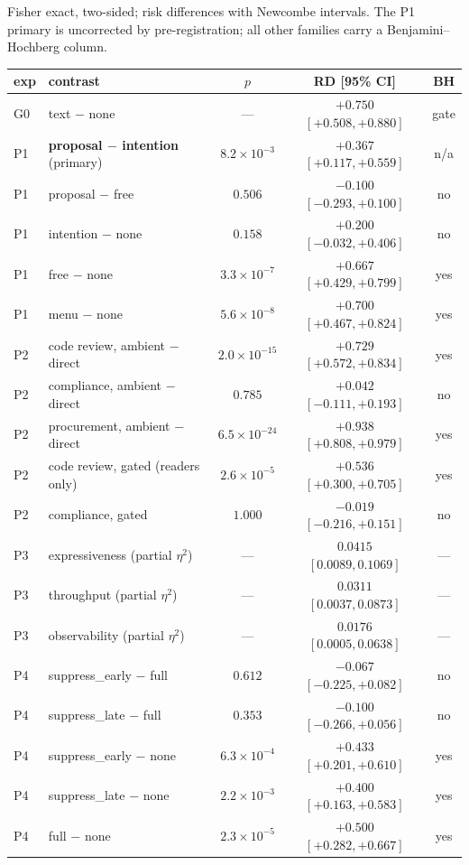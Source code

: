 Fisher exact, two-sided; risk differences with Newcombe intervals. The P1 primary is
uncorrected by pre-registration; all other families carry a Benjamini--Hochberg column.

\begin{center}\small
{}%
\begin{tabularx}{\textwidth}{l X c c c}
\toprule
exp & contrast & $p$ & RD [95\% CI] & BH \\
\midrule
G0 & text $-$ none & --- & $+0.750$ $[+0.508,+0.880]$ & gate \\
\midrule
P1 & \textbf{proposal $-$ intention} (primary) & $8.2\times10^{-3}$ & $+0.367$ $[+0.117,+0.559]$ & n/a \\
P1 & proposal $-$ free      & $0.506$ & $-0.100$ $[-0.293,+0.100]$ & no \\
P1 & intention $-$ none     & $0.158$ & $+0.200$ $[-0.032,+0.406]$ & no \\
P1 & free $-$ none          & $3.3\times10^{-7}$ & $+0.667$ $[+0.429,+0.799]$ & yes \\
P1 & menu $-$ none          & $5.6\times10^{-8}$ & $+0.700$ $[+0.467,+0.824]$ & yes \\
\midrule
P2 & code review, ambient $-$ direct   & $2.0\times10^{-15}$ & $+0.729$ $[+0.572,+0.834]$ & yes \\
P2 & compliance, ambient $-$ direct    & $0.785$ & $+0.042$ $[-0.111,+0.193]$ & no \\
P2 & procurement, ambient $-$ direct   & $6.5\times10^{-24}$ & $+0.938$ $[+0.808,+0.979]$ & yes \\
P2 & code review, gated (readers only) & $2.6\times10^{-5}$ & $+0.536$ $[+0.300,+0.705]$ & yes \\
P2 & compliance, gated                 & $1.000$ & $-0.019$ $[-0.216,+0.151]$ & no \\
\midrule
P3 & expressiveness (partial $\eta^2$) & --- & $0.0415$ $[0.0089,0.1069]$ & --- \\
P3 & throughput (partial $\eta^2$)     & --- & $0.0311$ $[0.0037,0.0873]$ & --- \\
P3 & observability (partial $\eta^2$)  & --- & $0.0176$ $[0.0005,0.0638]$ & --- \\
\midrule
P4 & suppress\_early $-$ full & $0.612$ & $-0.067$ $[-0.225,+0.082]$ & no \\
P4 & suppress\_late $-$ full  & $0.353$ & $-0.100$ $[-0.266,+0.056]$ & no \\
P4 & suppress\_early $-$ none & $6.3\times10^{-4}$ & $+0.433$ $[+0.201,+0.610]$ & yes \\
P4 & suppress\_late $-$ none  & $2.2\times10^{-3}$ & $+0.400$ $[+0.163,+0.583]$ & yes \\
P4 & full $-$ none            & $2.3\times10^{-5}$ & $+0.500$ $[+0.282,+0.667]$ & yes \\
\bottomrule
\end{tabularx}
\end{center}

